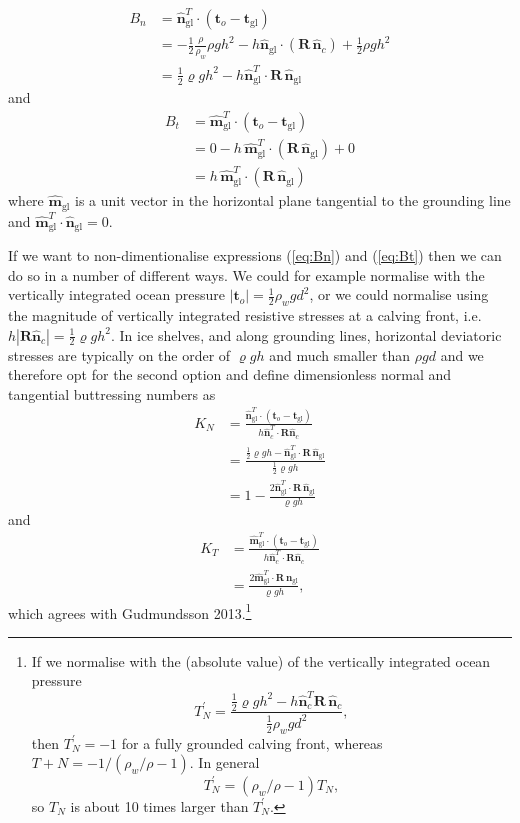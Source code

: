 \documentclass[10pt,a4paper]{book}
\newcommand{\ngl}{\hat{\bm{n}}_{\mathrm{gl}}}
\newcommand{\mgl}{\hat{\bm{m}}_{\mathrm{gl}}}
\newcommand{\normalc}{\hat{\bm{n}}_{c}}
\newcommand{\tgl}{\bm{t}_{\mathrm{gl}}}
\newcommand{\tO}{\bm{t}_o}
\begin{document}
\begin{align}
B_n &= \ngl^T \cdot ( \bm{t}_o - \tgl )\\
&= - \frac{1}{2} \frac{\rho}{\rho_w} \rho g h^2 -  h \ngl \cdot (\bm{R} \, \normalc) + \frac{1}{2} \rho g h^2\\
&=\frac{1}{2} \varrho g h^2 - h \ngl^T \cdot \bm{R} \, \ngl \label{eq:Bn}
\end{align}
and
\begin{align}
B_t &= \mgl^T \cdot ( \bm{t}_o - \tgl )\\
&= 0 -  h\,  \mgl^T \cdot (\bm{R} \, \ngl) + 0\\
&=h \, \mgl^T \cdot (\bm{R} \, \ngl) \label{eq:Bt}
\end{align}
where $\mgl$ is a unit vector in the horizontal plane tangential to
the grounding line and $\mgl^T \cdot \ngl=0$.


If we want to non-dimentionalise expressions (\ref{eq:Bn}) and
(\ref{eq:Bt}) then we can do so in a number of different ways. We
could for example normalise with the vertically integrated ocean
pressure $|\tO|=\frac{1}{2} \rho_w g d^2$, or we could normalise using
the magnitude of vertically integrated resistive stresses at a calving front, i.e.\ $h
|\bm{R} \normalc|=\frac{1}{2} \varrho g h^2$. In ice shelves, and along
grounding lines, horizontal deviatoric stresses are typically on the
order of $\varrho g h$ and much smaller than $\rho g d$ and we
therefore opt for the second option and define dimensionless normal and
tangential buttressing numbers as
\begin{align}
  K_N&=\frac{\ngl^T \cdot (\tO-\tgl)}{h \normalc^T \cdot \bm{R} \normalc} \\
  &=\frac{\frac{1}{2} \varrho g h -  \ngl^T \cdot \bm{R} \, \ngl}{\frac{1}{2} \varrho g h }\\
   &=1- \frac{2 \ngl^T \cdot \bm{R} \, \ngl}{\varrho g h }
\end{align}
and
\begin{align}
  K_T&=\frac{\mgl^T \cdot ( \bm{t}_o - \tgl )}{h \normalc^T \cdot \bm{R} \normalc} \\
     &=\frac{2 \mgl^T \cdot \bm{R} \, \ngl }{\varrho g h} ,
\end{align}
which agrees with Gudmundsson 2013.\footnote{If we normalise with the
  (absolute value) of the vertically integrated ocean pressure
\[
T_N^{'}=\frac{\frac{1}{2} \varrho g h^2 - h \normalc^T \bm{R} \, \normalc}
{\frac{1}{2} \rho_w g d^2  },
\]
then $T_N^{'}=-1$ for a fully grounded calving front, whereas $T+N=-1/(\rho_w/\rho-1)$. In general
\[
T_N^{'}=(\rho_w/\rho-1) T_N,
\]
so $T_N$ is about 10 times larger than $T_N^{'}$.}
\end{document}
